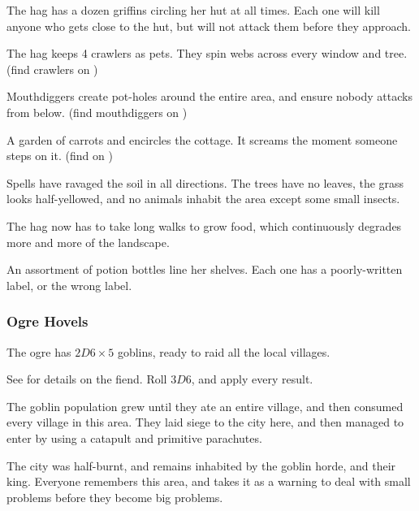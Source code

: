 \begin{multicols}{2}
\begin{dlist}
  \item
  The \gls{hag} has a dozen griffins circling her hut at all times.
  Each one will kill anyone who gets close to the hut, but will not attack them before they approach.
  \item
  The \gls{hag} keeps 4 \glspl{crawler} as pets.
  They spin webs across every window and tree.
  (find \glspl{crawler} on )
  \item
  Mouthdiggers create pot-holes around the entire area, and ensure nobody attacks from below.
  (find mouthdiggers on )
  \item
  A garden of carrots and  encircles the cottage.
  It screams the moment someone steps on it.
  (find  on )
  \item
  Spells have ravaged the soil in all directions.
  The trees have no leaves, the grass looks half-yellowed, and no animals inhabit the area except some small insects.

  The \gls{hag} now has to take long walks to grow food, which continuously degrades more and more of the landscape.
  \item
  An assortment of potion bottles line her shelves.
  Each one has a poorly-written label, or the wrong label.
\end{dlist}

\subsubsection{Ogre Hovels}
\label{ogrePoint}

The \gls{ogre} has $2D6 \times 5$ goblins, ready to raid all the local \glspl{village}.

See  for details on the fiend.
Roll $3D6$, and apply every result.

\begin{dlist}
  \item
  The goblin population grew until they ate an entire \gls{village}, and then consumed every \gls{village} in this area.
  They laid siege to the city here, and then managed to enter by using a catapult and primitive parachutes.

  The city was half-burnt, and remains inhabited by the goblin horde, and their king.
  Everyone remembers this area, and takes it as a warning to deal with small problems before they become big problems.


\end{dlist}
\end{multicols}
